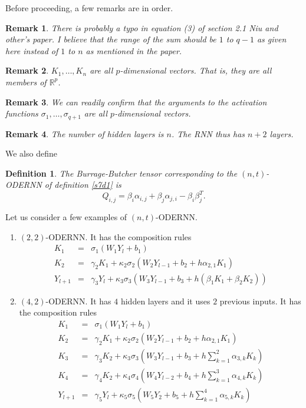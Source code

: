 \documentclass{article}
\numberwithin{equation}{section}
\newtheorem{defn}{Definition}
\newtheorem*{rem}{Remark}
\begin{document}
\noindent Before proceeding, a few remarks are in order.
\begin{rem}
There is probably a typo in equation (3) of section 2.1 Niu and other's
paper\cite{niu2019recurrent}. I believe that the range of the sum should
be $1$ to $q - 1$ as given here instead of $1$ to $n$ as mentioned in the
paper.
\end{rem}
\begin{rem}
$K_1, \ldots, K_n$ are all $p$-dimensional vectors. That is, they 
are all members of $\mathbb{R}^p$.
\end{rem}
\begin{rem}
We can readily confirm that the arguments to the activation functions
$\sigma_1, \ldots, \sigma_{q+1}$ are all $p$-dimensional vectors.
\end{rem}
\begin{rem}
The number of hidden layers is $n$. The RNN thus has $n + 2$ layers. 
\end{rem}

\noindent We also define
\begin{defn}\label{s7d2}
The Burrage-Butcher tensor corresponding to the $(n,t)$-ODERNN of 
definition \ref{s7d1} is
\begin{equation}\label{x}
Q_{i, j} = \beta_i\alpha_{i, j} + \beta_j\alpha_{j, i} - \beta_i\beta_j^T.
\end{equation}
\end{defn}

\noindent Let us consider a few examples of $(n,t)$-ODERNN.
\begin{enumerate}
\item $(2,2)$-ODERNN. It has the composition rules
\begin{eqnarray*}
K_1 &=& \sigma_1(W_1 Y_l + b_1) \\
K_2 &=& \gamma_2K_1 + \kappa_2\sigma_2(W_2Y_{l-1}+b_2+h\alpha_{2,1}K_1) \\
Y_{l+1} &=& \gamma_3Y_l + \kappa_3\sigma_3\left(
 W_3 Y_{l-1} + b_3 + h(\beta_1K_1 + \beta_2K_2)\right)
\end{eqnarray*}
\item $(4, 2)$-ODERNN. It has $4$ hidden layers and it uses $2$ previous
inputs. It has the composition rules
\begin{eqnarray*}
K_1 &=& \sigma_1(W_1 Y_l + b_1) \\
K_2 &=& \gamma_2K_1 + \kappa_2\sigma_2(W_2Y_{l-1}+b_2+h\alpha_{2,1}K_1) \\
K_3 &=& \gamma_3K_2 + \kappa_3\sigma_3\left(W_3Y_{l-1} + b_3 + 
    h\sum_{k=1}^{2}\alpha_{3, k}K_k\right) \\
K_4 &=& \gamma_4K_2 + \kappa_4\sigma_4\left(W_4Y_{l-2} + b_4 + 
    h\sum_{k=1}^{3}\alpha_{4, k}K_k\right) \\
Y_{l+1} &=& \gamma_5Y_l + \kappa_5\sigma_5\left(W_5Y_2 + b_5 + 
    h\sum_{k=1}^{4}\alpha_{5, k}K_k\right) 
\end{eqnarray*}
\end{enumerate}
\end{document}
